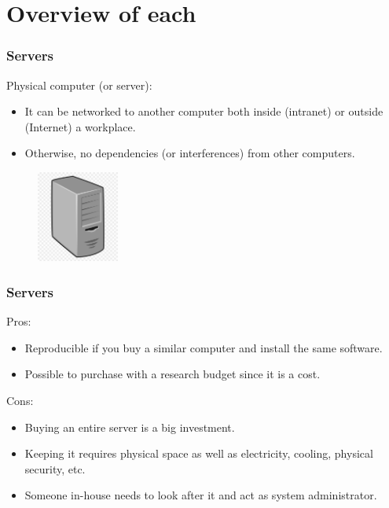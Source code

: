 \documentclass[11pt,aspectratio=43,ignorenonframetext,t]{beamer}
\begin{document}
\section{Overview of each}


\begin{frame}

\frametitle{Servers}

Physical computer (or server):
\begin{itemize}
  \item It can be networked to another computer both inside (intranet) or outside (Internet) a workplace.
  \item Otherwise, no dependencies (or interferences) from other computers.
\end{itemize}

\begin{figure}
  \centering
  \includegraphics[height=3cm]{imgs/server}
\end{figure}

\end{frame}


\begin{frame}

\frametitle{Servers}

Pros:
\begin{itemize}
  \item Reproducible if you buy a similar computer and install the same software.
  \item Possible to purchase with a research budget since it is a {} cost.
\end{itemize}

Cons:
\begin{itemize}
  \item Buying an entire server is a big investment.
  \item Keeping it requires physical space as well as electricity, cooling, physical security, etc.
  \item Someone in-house needs to look after it and act as system administrator.
\end{itemize}

\end{frame}
\end{document}
